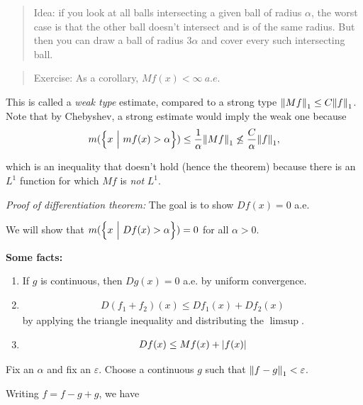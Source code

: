 \begin{quote}
Idea: if you look at all balls intersecting a given ball of radius
\(\alpha\), the worst case is that the other ball doesn't intersect and
is of the same radius. But then you can draw a ball of radius
\(3\alpha\) and cover every such intersecting ball.
\end{quote}

\begin{quote}
Exercise: As a corollary, \(Mf(x) < \infty~a.e.\)
\end{quote}

This is called a \emph{weak type} estimate, compared to a strong type
\({\left\lVert {Mf} \right\rVert}_1 \leq C {\left\lVert {f} \right\rVert}_1\). Note that by Chebyshev, a strong
estimate would imply the weak one because
\begin{align*}
m(\left\{{x {~\mathrel{\Big|}~} mf(x) > \alpha}\right\}) \leq \frac{1}{\alpha} {\left\lVert {Mf} \right\rVert}_1 \not\leq \frac{C}{\alpha} {\left\lVert {f} \right\rVert}_1,
\end{align*}

which is an inequality that doesn't hold (hence the theorem) because
there is an \(L^1\) function for which \(Mf\) is \emph{not} \(L^1\).

\emph{Proof of differentiation theorem:} The goal is to show
\(Df(x) = 0\) a.e.

We will show that \(m(\left\{{x{~\mathrel{\Big|}~} Df(x) > \alpha}\right\}) = 0\) for all
\(\alpha > 0\).

\textbf{Some facts:}

\begin{enumerate}
\def\labelenumi{\arabic{enumi}.}
\item
  If \(g\) is continuous, then \(Dg(x) = 0\) a.e. by uniform
  convergence.
\item

  \begin{align*}
  D(f_1 + f_2)(x) \leq Df_1(x) + Df_2(x)
  \end{align*} by applying the triangle inequality and distributing the
  \(\limsup\).
\item

  \begin{align*}
  Df(x) \leq Mf(x) + {\left\lvert {f(x)} \right\rvert}
  \end{align*}
\end{enumerate}

Fix an \(\alpha\) and fix an \(\varepsilon\). Choose a continuous \(g\)
such that \({\left\lVert {f-g} \right\rVert}_1 < \varepsilon\).

Writing \(f=f-g+g\), we have

